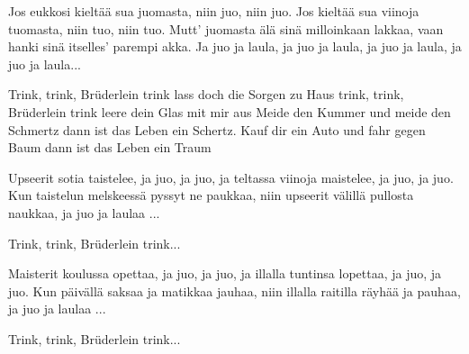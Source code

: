 
  
\beginverse*
Jos eukkosi kieltää sua juomasta,
niin juo, niin juo.
Jos kieltää sua viinoja tuomasta,
niin tuo, niin tuo.
Mutt' juomasta älä sinä milloinkaan lakkaa,
vaan hanki sinä itselles' parempi akka.
Ja juo ja laula, ja juo ja laula,
ja juo ja laula, ja juo ja laula...
\endverse

\beginchorus
Trink, trink, Brüderlein trink
lass doch die Sorgen zu Haus
trink, trink, Brüderlein trink
leere dein Glas mit mir aus
Meide den Kummer und meide den Schmertz
dann ist das Leben ein Schertz.
Kauf dir ein Auto und fahr gegen Baum
dann ist das Leben ein Traum
\endchorus

\beginverse*
Upseerit sotia taistelee,
ja juo, ja juo,
ja teltassa viinoja maistelee,
ja juo, ja juo.
Kun taistelun melskeessä pyssyt ne paukkaa,
niin upseerit välillä pullosta naukkaa,
ja juo ja laulaa ...
\endverse

\beginchorus
Trink, trink, Brüderlein trink...
\endchorus

\beginverse*
Maisterit koulussa opettaa,
ja juo, ja juo,
ja illalla tuntinsa lopettaa,
ja juo, ja juo.
Kun päivällä saksaa ja matikkaa jauhaa,
niin illalla raitilla räyhää ja pauhaa,
ja juo ja laulaa ...
\endverse

\beginchorus
Trink, trink, Brüderlein trink...
\endchorus

\endsong
